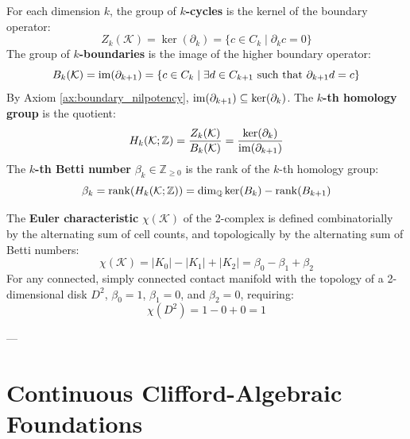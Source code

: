 \begin{definition}
For each dimension $k$, the group of \textbf{$k$-cycles} is the kernel of the boundary operator:
\begin{equation}
    Z_k(\mathcal{K}) = \ker(\partial_k) = \{ c \in C_k \mid \partial_k c = 0 \}
\end{equation}
The group of \textbf{$k$-boundaries} is the image of the higher boundary operator:
\begin{equation}
    B_k(\mathcal{K}) = \operatorname{im}(\partial_{k+1}) = \{ c \in C_k \mid \exists d \in C_{k+1} \text{ such that } \partial_{k+1} d = c \}
\end{equation}
By Axiom \ref{ax:boundary_nilpotency}, $\operatorname{im}(\partial_{k+1}) \subseteq \ker(\partial_k)$. The \textbf{$k$-th homology group} is the quotient:
\begin{equation}
    H_k(\mathcal{K}; \mathbb{Z}) = \frac{Z_k(\mathcal{K})}{B_k(\mathcal{K})} = \frac{\ker(\partial_k)}{\operatorname{im}(\partial_{k+1})}
\end{equation}
The \textbf{$k$-th Betti number} $\beta_k \in \mathbb{Z}_{\ge 0}$ is the rank of the $k$-th homology group:
\begin{equation}
    \beta_k = \operatorname{rank}(H_k(\mathcal{K}; \mathbb{Z})) = \dim_{\mathbb{Q}} \ker(B_k) - \operatorname{rank}(B_{k+1})
\end{equation}
\end{definition}

\begin{definition}
The \textbf{Euler characteristic} $\chi(\mathcal{K})$ of the 2-complex is defined combinatorially by the alternating sum of cell counts, and topologically by the alternating sum of Betti numbers:
\begin{equation}
    \chi(\mathcal{K}) = |K_0| - |K_1| + |K_2| = \beta_0 - \beta_1 + \beta_2
\end{equation}
For any connected, simply connected contact manifold with the topology of a 2-dimensional disk $D^2$, $\beta_0 = 1$, $\beta_1 = 0$, and $\beta_2 = 0$, requiring:
\begin{equation}
    \chi(D^2) = 1 - 0 + 0 = 1
\end{equation}
\end{definition}

---

\section{Continuous Clifford-Algebraic Foundations}
\label{sec:continuous_clifford_foundations}

